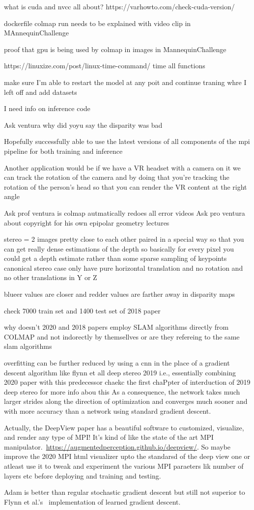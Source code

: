 what is cuda and nvcc all about?
https://varhowto.com/check-cuda-version/

dockerfile colmap run needs to be explained with video clip in MAnnequinChallenge

proof that gpu is being used by colmap in images in MannequinChallenge


https://linuxize.com/post/linux-time-command/
time all functions

make sure I'm able to restart the model at any poit and continue traning whre I left off and add datasets 

I need info on inference code 

Ask ventura why did yoyu say the disparity was bad

Hopefully successfully able to use the latest versions of all components of the mpi pipeline for both training and inference  

Another application would be if we have a VR headset with a camera on it we can track the rotation of the camera and by doing that you're tracking the rotation of the person's head so that you can render the VR content at the right angle

Ask prof ventura is colmap autmatically redoes all error videos 
Ask pro ventura about copyright for his own epipolar geometry lectures

stereo = 2 images pretty close to each other paired in a special way so that you can get really dense estimations of the depth so basically for every pixel you could get a depth estimate rather than some sparse sampling of keypoints
canonical stereo case only have pure horizontal translation and no rotation and no other translations in Y or Z  

blueer values are closer and redder values are farther away in disparity maps

check 7000 train set and 1400 test set of 2018 paper

why doesn't 2020 and 2018 papers employ SLAM algorithms directly from COLMAP and not indorectly by themsellves or are they refereing to the same slam algorithms

overfitting can be further reduced by using a cnn in the place of a gradient descent algorithm like flynn et all deep stereo 2019 i.e., essentially combining 2020 paper with this predecessor 
chaekc the first chaPpter of interduction of 2019 deep stereo for more info abou this
As a consequence, the network takes much larger strides along the direction of optimization and converges much sooner and with more accuracy than a network using standard gradient descent.

Actually, the DeepView paper has a beautiful software to customized, visualize, and render any type of MPI! It's kind of like the state of the art MPI manipulator.~\url{https://augmentedperception.github.io/deepview/}. So maybe improve the 2020 MPI html visualizer upto the standarsd of the deep view one or atleast use it to tweak and experiment the various MPI paraeters lik number of layers etc before deploying and training and testing.

Adam is better than regular stochastic gradient descent but still not superior to Flynn et al.'s~\cite{flynn_deepview_2019} implementation of learned gradient descent.